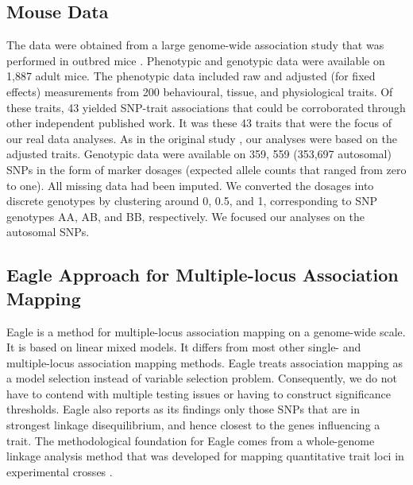\documentclass{article}
\begin{document}
\subsection{Mouse Data}

The data were obtained from a large genome-wide association study that was performed in outbred mice \cite{nicod2016genome}. 
Phenotypic and genotypic data were available on 1,887 adult mice. 
The phenotypic data included raw and adjusted (for fixed effects) measurements from 200 behavioural, tissue, and physiological traits.  
Of these traits, 
43 yielded SNP-trait associations that could be corroborated through other independent published work. It was these 
43 traits that were the focus of our real data analyses. As in the original study  \cite{nicod2016genome}, our analyses 
were based on the adjusted traits.
Genotypic data were available on 359, 559 (353,697 autosomal) SNPs in the 
form of marker dosages (expected allele counts that ranged from zero to one). All missing data had been imputed. 
We converted the dosages into discrete genotypes 
by clustering around 0, 0.5, and 1, corresponding to SNP genotypes AA, AB, and BB, respectively. 
We focused our analyses on the autosomal SNPs.




\subsection{Eagle Approach for Multiple-locus Association Mapping}

Eagle is a method for multiple-locus association mapping on a genome-wide scale. It is based on linear mixed models. It differs from most other single- and multiple-locus association mapping methods. Eagle treats association mapping as a model selection instead of variable selection problem. Consequently,  we do not have to contend with multiple testing issues or having to construct significance thresholds.  
Eagle also 
reports as its findings only those SNPs that are in strongest linkage disequilibrium, and hence closest to the genes influencing a trait. 
The methodological foundation for Eagle comes from a whole-genome linkage analysis method that was developed for mapping 
quantitative trait loci in experimental crosses \cite{verbyla2007analysis}.
\end{document}
